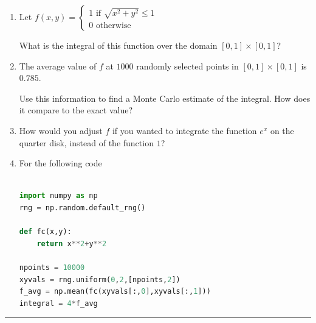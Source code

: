 \documentclass[12pt,letterpaper,noanswers]{exam}
\begin{document}
\begin{enumerate}[resume]
    \item Let $f(x,y) = \left\{\begin{array}{l} 1\text{ if } \sqrt{x^2+y^2}\leq 1 \\
    0 \text{ otherwise }
     \end{array}\right.$

     What is the integral of this function over the domain $[0,1]\times [0,1]$?
     \item The average value of $f$ at $1000$ randomly selected points in $[0,1]\times [0,1]$ is $0.785$.

     Use this information to find a Monte Carlo estimate of the integral.  How does it compare to the exact value?

     \item How would you adjust $f$ if you wanted to integrate the function $e^x$ on the quarter disk, instead of the function $1$?

\item 
For the following code
\begin{lstlisting}[basicstyle=\small,language=python]

import numpy as np
rng = np.random.default_rng()

def fc(x,y): 
    return x**2+y**2
    
npoints = 10000
xyvals = rng.uniform(0,2,[npoints,2])
f_avg = np.mean(fc(xyvals[:,0],xyvals[:,1]))
integral = 4*f_avg
\end{lstlisting}
\end{enumerate}





\vspace{0.2cm}
\hrule
\vspace{0.2cm}
\end{document}
